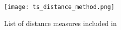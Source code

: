 \documentclass[12pt]{article}
\begin{document}
\begin{figure}[!ht]
    \centering
    \texttt{[image: ts\_distance\_method.png]}
    \caption{List of distance measures included in \cite{ElsingAgon2012}}
    \label{fig:ds_dist_meas_table}
\end{figure}


\pagebreak


\printbibliography
\end{document}
